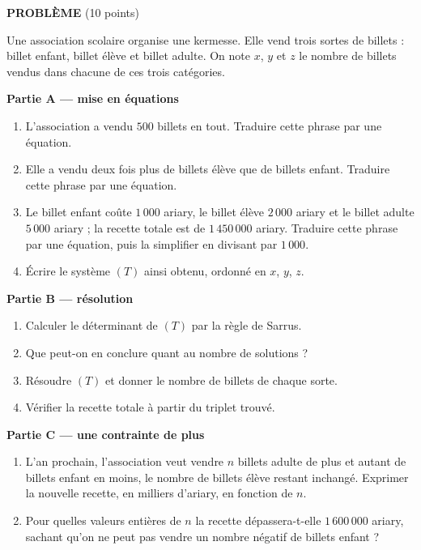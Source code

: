 \begin{devoirsurveille}
\vspace{0.7em}
\noindent\textbf{\sffamily PROBLÈME} \hfill \textup{(10 points)}

Une association scolaire organise une kermesse. Elle vend trois
sortes de billets : billet enfant, billet élève et billet adulte. On note
$x$, $y$ et $z$ le nombre de billets vendus dans chacune de ces trois
catégories.

\medskip
\noindent\textbf{Partie A — mise en équations}

\begin{enumerate}[label=\textbf{\arabic*.}, leftmargin=*, itemsep=0.25em]
  \item L'association a vendu $500$ billets en tout. Traduire cette phrase
        par une équation. 
  \item Elle a vendu deux fois plus de billets élève que de billets enfant.
        Traduire cette phrase par une équation. 
  \item Le billet enfant coûte $1\,000$ ariary, le billet élève $2\,000$
        ariary et le billet adulte $5\,000$ ariary ; la recette totale est de
        $1\,450\,000$ ariary. Traduire cette phrase par une équation, puis
        la simplifier en divisant par $1\,000$. 
  \item Écrire le système $(T)$ ainsi obtenu, ordonné en $x$, $y$, $z$.
\end{enumerate}

\medskip
\noindent\textbf{Partie B — résolution}

\begin{enumerate}[label=\textbf{\arabic*.}, leftmargin=*, itemsep=0.25em, start=5]
  \item Calculer le déterminant de $(T)$ par la règle de Sarrus.
  \item Que peut-on en conclure quant au nombre de solutions ?
  \item Résoudre $(T)$ et donner le nombre de billets de chaque sorte.
  \item Vérifier la recette totale à partir du triplet trouvé.
\end{enumerate}

\medskip
\noindent\textbf{Partie C — une contrainte de plus}

\begin{enumerate}[label=\textbf{\arabic*.}, leftmargin=*, itemsep=0.25em, start=9]
  \item L'an prochain, l'association veut vendre $n$ billets adulte de plus
        et autant de billets enfant en moins, le nombre de billets élève
        restant inchangé. Exprimer la nouvelle recette, en milliers
        d'ariary, en fonction de $n$. 
  \item Pour quelles valeurs entières de $n$ la recette dépassera-t-elle
        $1\,600\,000$ ariary, sachant qu'on ne peut pas vendre un nombre
        négatif de billets enfant ? 
\end{enumerate}
\end{devoirsurveille}

